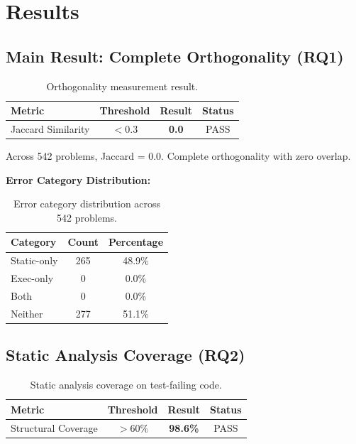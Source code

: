 \section{Results}
\label{sec:results}

\subsection{Main Result: Complete Orthogonality (RQ1)}

\begin{table}[h]
\centering
\begin{tabular}{lccc}
\toprule
\textbf{Metric} & \textbf{Threshold} & \textbf{Result} & \textbf{Status} \\
\midrule
Jaccard Similarity & $< 0.3$ & \textbf{0.0} & PASS \\
\bottomrule
\end{tabular}
\caption{Orthogonality measurement result.}
\label{tab:main_result}
\end{table}

Across 542 problems, Jaccard = 0.0. Complete orthogonality with zero overlap.

\textbf{Error Category Distribution:}

\begin{table}[h]
\centering
\begin{tabular}{lcc}
\toprule
\textbf{Category} & \textbf{Count} & \textbf{Percentage} \\
\midrule
Static-only & 265 & 48.9\% \\
Exec-only & 0 & 0.0\% \\
Both & 0 & 0.0\% \\
Neither & 277 & 51.1\% \\
\bottomrule
\end{tabular}
\caption{Error category distribution across 542 problems.}
\label{tab:error_distribution}
\end{table}

\subsection{Static Analysis Coverage (RQ2)}

\begin{table}[h]
\centering
\begin{tabular}{lccc}
\toprule
\textbf{Metric} & \textbf{Threshold} & \textbf{Result} & \textbf{Status} \\
\midrule
Structural Coverage & $> 60\%$ & \textbf{98.6\%} & PASS \\
\bottomrule
\end{tabular}
\caption{Static analysis coverage on test-failing code.}
\label{tab:coverage}
\end{table}

